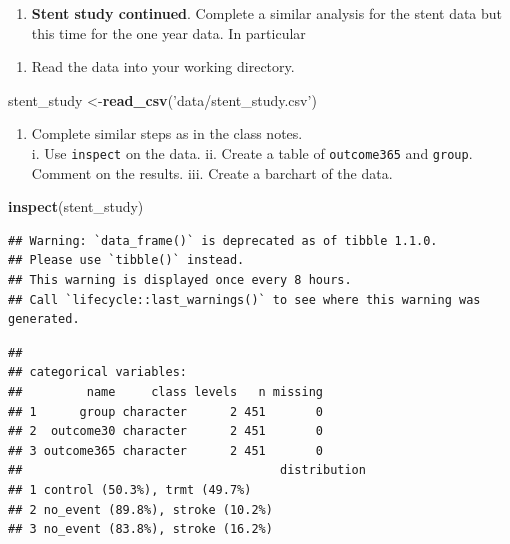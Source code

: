 \documentclass[
]{book}
\newenvironment{Shaded}{\begin{snugshade}}{\end{snugshade}}
\newcommand{\KeywordTok}[1]{\textcolor[rgb]{0.13,0.29,0.53}{\textbf{#1}}}
\newcommand{\NormalTok}[1]{#1}
\newcommand{\StringTok}[1]{\textcolor[rgb]{0.31,0.60,0.02}{#1}}
\providecommand{\tightlist}{%
  \setlength{\itemsep}{0pt}\setlength{\parskip}{0pt}}
\begin{document}
\begin{enumerate}
\def\labelenumi{\arabic{enumi}.}
\tightlist
\item
  \textbf{Stent study continued}. Complete a similar analysis for the stent data but this time for the one year data. In particular
\end{enumerate}

\begin{enumerate}
\def\labelenumi{\alph{enumi}.}
\tightlist
\item
  Read the data into your working directory.
\end{enumerate}

\begin{Shaded}
\begin{Highlighting}[]
\NormalTok{stent_study <-}\KeywordTok{read_csv}\NormalTok{(}\StringTok{'data/stent_study.csv'}\NormalTok{)}
\end{Highlighting}
\end{Shaded}

\begin{enumerate}
\def\labelenumi{\alph{enumi}.}
\setcounter{enumi}{1}
\tightlist
\item
  Complete similar steps as in the class notes.\\
  i. Use \texttt{inspect} on the data.
  ii. Create a table of \texttt{outcome365} and \texttt{group}. Comment on the results.
  iii. Create a barchart of the data.
\end{enumerate}

\begin{Shaded}
\begin{Highlighting}[]
\KeywordTok{inspect}\NormalTok{(stent_study)}
\end{Highlighting}
\end{Shaded}

\begin{verbatim}
## Warning: `data_frame()` is deprecated as of tibble 1.1.0.
## Please use `tibble()` instead.
## This warning is displayed once every 8 hours.
## Call `lifecycle::last_warnings()` to see where this warning was generated.
\end{verbatim}

\begin{verbatim}
## 
## categorical variables:  
##         name     class levels   n missing
## 1      group character      2 451       0
## 2  outcome30 character      2 451       0
## 3 outcome365 character      2 451       0
##                                    distribution
## 1 control (50.3%), trmt (49.7%)                
## 2 no_event (89.8%), stroke (10.2%)             
## 3 no_event (83.8%), stroke (16.2%)
\end{verbatim}
\end{document}
